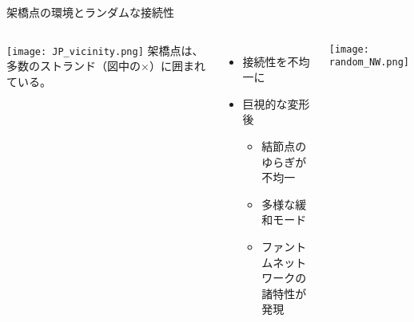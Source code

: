 \begin{columns}[totalwidth=.9\linewidth]
    \column{\textwidth}
    \begin{itembox}[l]{架橋点の環境とランダムな接続性}
        \begin{columns}[totalwidth=\textwidth]
                \texttt{[image: JP\_vicinity.png]}
                架橋点は、\alert{多数のストランド（図中の×）}に囲まれている。
                \begin{itemize}
                    \item 接続性を不均一に
                    \item 巨視的な変形後
                        \begin{itemize}
                            \item \alert{結節点のゆらぎが不均一}
                            \item 多様な緩和モード
                        \item ファントムネットワークの\\諸特性が発現
                        \end{itemize}
                \end{itemize}
				\texttt{[image: random\_NW.png]}
		\end{columns}
    \end{itembox}
\end{columns}